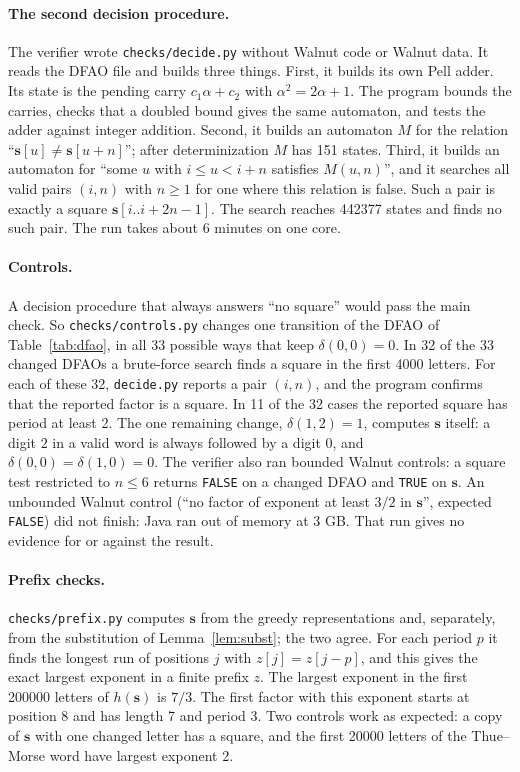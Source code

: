\documentclass[11pt]{article}
\theoremstyle{definition}
\theoremstyle{remark}
\newcommand{\PSQ}{\mathbf{s}}
\begin{document}
\paragraph{The second decision procedure.} The verifier wrote \texttt{checks/decide.py} without Walnut code or Walnut data. It reads the DFAO file and builds three things. First, it builds its own Pell adder. Its state is the pending carry $c_1\alpha + c_2$ with $\alpha^2 = 2\alpha + 1$. The program bounds the carries, checks that a doubled bound gives the same automaton, and tests the adder against integer addition. Second, it builds an automaton $M$ for the relation ``$\PSQ[u] \neq \PSQ[u+n]$''; after determinization $M$ has 151 states. Third, it builds an automaton for ``some $u$ with $i \le u < i+n$ satisfies $M(u, n)$'', and it searches all valid pairs $(i, n)$ with $n \ge 1$ for one where this relation is false. Such a pair is exactly a square $\PSQ[i..i+2n-1]$. The search reaches 442377 states and finds no such pair. The run takes about 6 minutes on one core.

\paragraph{Controls.} A decision procedure that always answers ``no square'' would pass the main check. So \texttt{checks/controls.py} changes one transition of the DFAO of Table~\ref{tab:dfao}, in all 33 possible ways that keep $\delta(0,0) = 0$. In 32 of the 33 changed DFAOs a brute-force search finds a square in the first 4000 letters. For each of these 32, \texttt{decide.py} reports a pair $(i, n)$, and the program confirms that the reported factor is a square. In 11 of the 32 cases the reported square has period at least 2. The one remaining change, $\delta(1,2) = 1$, computes $\PSQ$ itself: a digit $2$ in a valid word is always followed by a digit $0$, and $\delta(0,0) = \delta(1,0) = 0$. The verifier also ran bounded Walnut controls: a square test restricted to $n \le 6$ returns \texttt{FALSE} on a changed DFAO and \texttt{TRUE} on $\PSQ$. An unbounded Walnut control (``no factor of exponent at least $3/2$ in $\PSQ$'', expected \texttt{FALSE}) did not finish: Java ran out of memory at 3 GB. That run gives no evidence for or against the result.

\paragraph{Prefix checks.} \texttt{checks/prefix.py} computes $\PSQ$ from the greedy representations and, separately, from the substitution of Lemma~\ref{lem:subst}; the two agree. For each period $p$ it finds the longest run of positions $j$ with $z[j] = z[j-p]$, and this gives the exact largest exponent in a finite prefix $z$. The largest exponent in the first 200000 letters of $h(\PSQ)$ is $7/3$. The first factor with this exponent starts at position 8 and has length 7 and period 3. Two controls work as expected: a copy of $\PSQ$ with one changed letter has a square, and the first 20000 letters of the Thue--Morse word have largest exponent 2.
\end{document}
